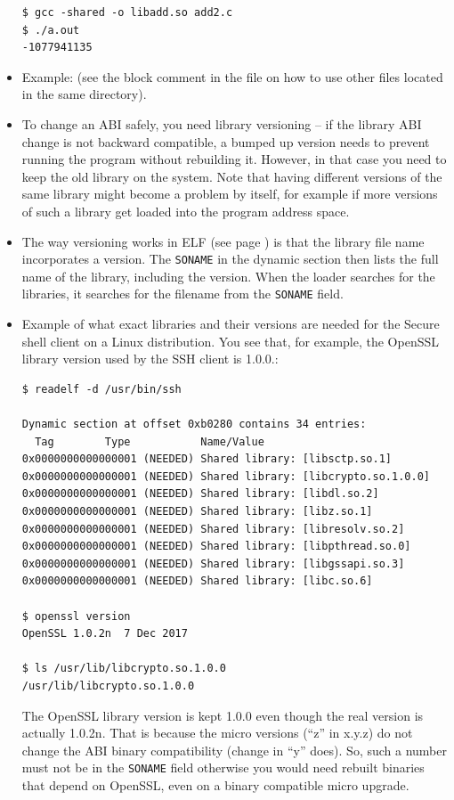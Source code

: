 \begin{itemize}
\begin{verbatim}
$ gcc -shared -o libadd.so add2.c 
$ ./a.out 
-1077941135
\end{verbatim}

\item \label{ABI_MAIN} Example:  (see the block
comment in the file on how to use other files located in the same directory).
\item To change an ABI safely, you need library versioning -- if the library
ABI change is not backward compatible, a bumped up version needs to prevent
running the program without rebuilding it.   However, in that case you need to keep
the old library on the system.  Note that having different versions of the same
library might become a problem by itself, for example if more versions of such
a library get loaded into the program address space.
\item The way versioning works in ELF (see page \pageref{ELF}) is that the
library file name incorporates a version.  The \texttt{SONAME} in the dynamic
section then lists the full name of the library, including the version.  When
the loader searches for the libraries, it searches for the filename from the
\texttt{SONAME} field.
\item Example of what exact libraries and their versions are needed for the
Secure shell client on a Linux distribution.  You see that, for example, the
OpenSSL library version used by the SSH client is 1.0.0.:

\begin{verbatim}
$ readelf -d /usr/bin/ssh

Dynamic section at offset 0xb0280 contains 34 entries:
  Tag        Type           Name/Value
0x0000000000000001 (NEEDED) Shared library: [libsctp.so.1]
0x0000000000000001 (NEEDED) Shared library: [libcrypto.so.1.0.0]
0x0000000000000001 (NEEDED) Shared library: [libdl.so.2]
0x0000000000000001 (NEEDED) Shared library: [libz.so.1]
0x0000000000000001 (NEEDED) Shared library: [libresolv.so.2]
0x0000000000000001 (NEEDED) Shared library: [libpthread.so.0]
0x0000000000000001 (NEEDED) Shared library: [libgssapi.so.3]
0x0000000000000001 (NEEDED) Shared library: [libc.so.6]

$ openssl version
OpenSSL 1.0.2n  7 Dec 2017

$ ls /usr/lib/libcrypto.so.1.0.0
/usr/lib/libcrypto.so.1.0.0
\end{verbatim}

\par The OpenSSL library version is kept 1.0.0 even though the real version is
actually 1.0.2n.  That is because the micro versions (``z'' in x.y.z) do not
change the ABI binary compatibility (change in ``y'' does).  So, such a number
must not be in the \texttt{SONAME} field otherwise you would need rebuilt
binaries that depend on OpenSSL, even on a binary compatible micro upgrade.
\end{itemize}

